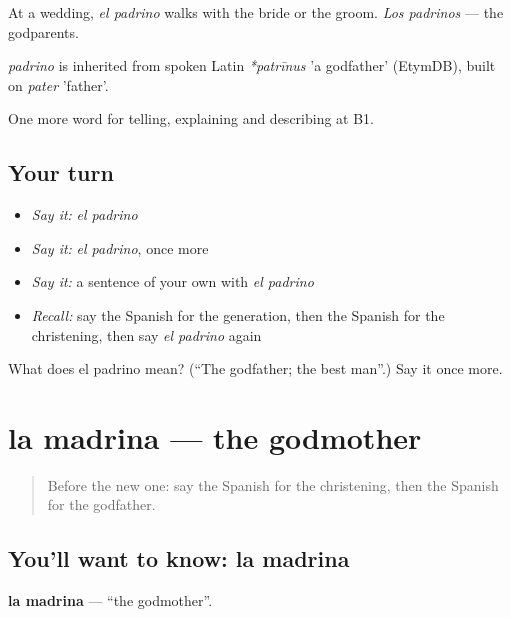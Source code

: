 At a wedding, \emph{el padrino} walks with the bride or the groom. \emph{Los padrinos} — the godparents.

\begin{cousinweb}
\emph{padrino} is inherited from spoken Latin \emph{*patrīnus} 'a godfather' (EtymDB), built on \emph{pater} 'father'.
\end{cousinweb}

\begin{grammarlens}[title={What you've built}]
One more word for telling, explaining and describing at B1.
\end{grammarlens}

\subsection*{Your turn}
\begin{itemize}
\raggedright
  \item \emph{Say it:} \emph{el padrino}
  \item \emph{Say it:} \emph{el padrino}, once more
  \item \emph{Say it:} a sentence of your own with \emph{el padrino}
  \item \emph{Recall:} say the Spanish for the generation, then the Spanish for the christening, then say \emph{el padrino} again
\end{itemize}

\begin{tcolorbox}[breakable,colback=teal!4,colframe=teal!35!black,title={Before you move on}]
What does el padrino mean? (\textquotedblleft{}The godfather; the best man\textquotedblright{}.) Say it once more.
\end{tcolorbox}
\section[la madrina]{la madrina — the godmother}

\label{lesson:ES-C546-madrina}



\begin{quote}
Before the new one: say the Spanish for the christening, then the Spanish for the godfather.
\end{quote}

\subsection*{You'll want to know: la madrina}
\textbf{la madrina} — \textquotedblleft{}the godmother\textquotedblright{}.

